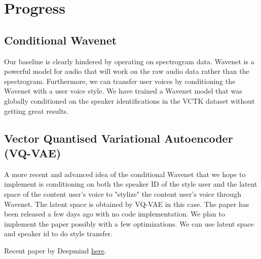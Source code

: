 \documentclass[a4paper]{article}
\begin{document}
\section{Progress}
\subsection{Conditional Wavenet}
Our baseline is clearly hindered by operating on spectrogram data. Wavenet is a powerful model for audio that will work on the raw audio data rather than the spectrogram. Furthermore, we can transfer user voices by conditioning the Wavenet with a user voice style. We have trained a Wavenet model that was globally conditioned on the speaker identifications in the VCTK dataset without getting great results.  

\subsection{Vector Quantised Variational Autoencoder (VQ-VAE)}
A more recent and advanced idea of the conditional Wavenet that we hope to implement is conditioning on both the speaker ID of the style user and the latent space of the content user's voice to "stylize" the content user's voice through Wavenet. The latent space is obtained by VQ-VAE in this case. The paper has been released a few days ago with no code implementation. We plan to implement the paper possibly with a few optimizations. We can use latent space and speaker id to do style transfer.

Recent paper by Deepmind \href{https://arxiv.org/pdf/1711.00937.pdf}{here}.
\end{document}
